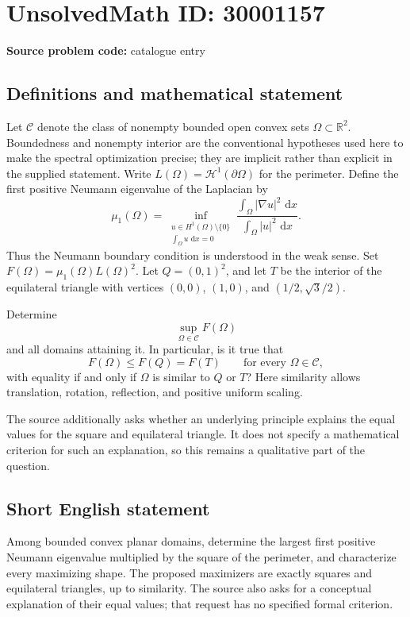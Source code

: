 \documentclass[11pt]{article}
\newcommand{\R}{\mathbb{R}}
\newcommand{\dd}{\,\mathrm{d}}
\begin{document}
\section*{UnsolvedMath ID: 30001157}
\textbf{Source problem code:} catalogue entry
\subsection{Definitions and mathematical statement}
Let \(\mathcal C\) denote the class of nonempty bounded open convex sets \(\Omega\subset\R^2\). Boundedness and nonempty interior are the conventional hypotheses used here to make the spectral optimization precise; they are implicit rather than explicit in the supplied statement. Write \(L(\Omega)=\mathcal H^1(\partial\Omega)\) for the perimeter. Define the first positive Neumann eigenvalue of the Laplacian by
\[
\mu_1(\Omega)=\inf_{\substack{u\in H^1(\Omega)\setminus\{0\}\\ \int_\Omega u\,\dd x=0}}
\frac{\int_\Omega |\nabla u|^2\,\dd x}{\int_\Omega |u|^2\,\dd x}.
\]
Thus the Neumann boundary condition is understood in the weak sense. Set \(F(\Omega)=\mu_1(\Omega)L(\Omega)^2\). Let \(Q=(0,1)^2\), and let \(T\) be the interior of the equilateral triangle with vertices \((0,0)\), \((1,0)\), and \((1/2,\sqrt3/2)\).

Determine
\[
\sup_{\Omega\in\mathcal C}F(\Omega)
\]
and all domains attaining it. In particular, is it true that
\[
F(\Omega)\leq F(Q)=F(T)\qquad\text{for every }\Omega\in\mathcal C,
\]
with equality if and only if \(\Omega\) is similar to \(Q\) or \(T\)? Here similarity allows translation, rotation, reflection, and positive uniform scaling.

The source additionally asks whether an underlying principle explains the equal values for the square and equilateral triangle. It does not specify a mathematical criterion for such an explanation, so this remains a qualitative part of the question.
\subsection{Short English statement}
Among bounded convex planar domains, determine the largest first positive Neumann eigenvalue multiplied by the square of the perimeter, and characterize every maximizing shape. The proposed maximizers are exactly squares and equilateral triangles, up to similarity. The source also asks for a conceptual explanation of their equal values; that request has no specified formal criterion.
\end{document}
